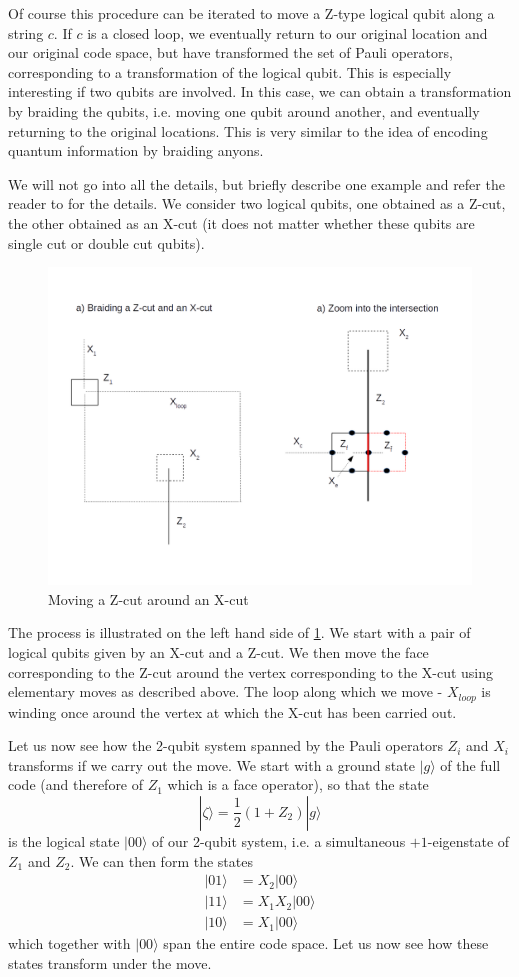 \documentclass[a4paper, draft]{article}
\theoremstyle{own}
\theoremstyle{remark}
\begin{document}
Of course this procedure can be iterated to move a Z-type logical qubit along a string $c$. If $c$ is a closed loop, we eventually return to our original location and our original code space, but have transformed the set of Pauli operators, corresponding to a transformation of the logical qubit. This is especially interesting if two qubits are involved. In this case, we can obtain a transformation by braiding the qubits, i.e. moving one qubit around another, and eventually returning to the original locations. This is very similar to the idea of encoding quantum information by braiding anyons. 

We will not go into all the details, but briefly describe one example and refer the reader to \cite{SurfaceCodes} for the details. We consider two logical qubits, one obtained as a Z-cut, the other obtained as an X-cut (it does not matter whether these qubits are single cut or double cut qubits). 

\begin{figure}[ht]
\centering
\includegraphics[width=0.7\linewidth]{images/BraidingZXCut}
\caption[Moving a Z-cut around an X-cut]{Moving a Z-cut around an X-cut}
\label{fig:BraidingZXCut}
\end{figure}


The process is illustrated on the left hand side of \ref{fig:BraidingZXCut}. We start with a pair of logical qubits given by an X-cut and a Z-cut. We then move the face corresponding to the Z-cut around the vertex corresponding to the X-cut using elementary moves as described above. The loop along which we move - $X_{loop}$ is winding once around the vertex at which the X-cut has been carried out. 

Let us now see how the 2-qubit system spanned by the Pauli operators $Z_i$ and $X_i$ transforms if we carry out the move. We start with a ground state $|g \rangle$ of the full code (and therefore of $Z_1$ which is a face operator), so that the state
$$
|\zeta \rangle = \frac{1}{2}(1 + Z_2) |g \rangle
$$
is the logical state $|00 \rangle$ of our 2-qubit system, i.e. a simultaneous $+1$-eigenstate of $Z_1$ and $Z_2$. We can then form the states
\begin{align*}
|01 \rangle &= X_2 |00 \rangle \\
|11 \rangle &= X_1 X_2 |00 \rangle \\
|10 \rangle &= X_1 |00 \rangle
\end{align*}
which together with $|00 \rangle$ span the entire code space. Let us now see how these states transform under the move.
\end{document}
